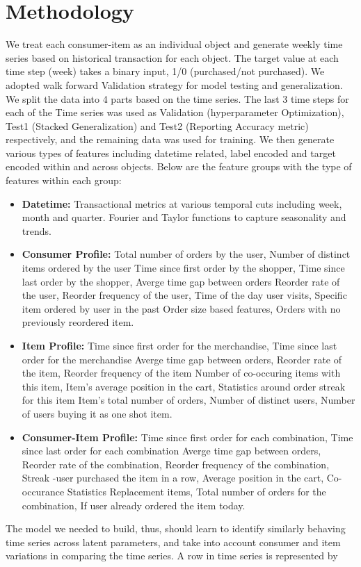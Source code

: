\section{Methodology}
We treat each consumer-item as an individual object and generate weekly time series based on historical transaction for 
each object. The target value at each time step (week) takes a binary input, 1/0 (purchased/not purchased).
We adopted walk forward Validation strategy for model testing and generalization. We split the data into 4 parts
based on the time series. The last 3 time steps for each of the Time series was used as Validation (hyperparameter Optimization),
Test1 (Stacked Generalization) and Test2 (Reporting Accuracy metric) respectively, and the remaining data was used for training.
We then generate various types of features including datetime related, label encoded and target encoded 
within and across objects. Below are the feature groups with the type of features within each group:
\begin{itemize}
\item {\bf Datetime:} Transactional metrics at various temporal cuts including week, month and quarter. 
Fourier and Taylor functions to capture seasonality and trends.
\item {\bf Consumer Profile:} Total number of orders by the user, Number of distinct items ordered by the user
Time since first order by the shopper, Time since last order by the shopper, Averge time gap between orders
Reorder rate of the user, Reorder frequency of the user, Time of the day user visits, Specific item ordered by user in the past
Order size based features, Orders with no previously reordered item.
\item {\bf Item Profile:} Time since first order for the merchandise, Time since last order for the merchandise
Averge time gap between orders, Reorder rate of the item, Reorder frequency of the item
Number of co-occuring items with this item, Item's average position in the cart, Statistics around order streak for this item
Item's total number of orders, Number of distinct users, Number of users buying it as one shot item.
\item {\bf Consumer-Item Profile:} Time since first order for each combination, Time since last order for each combination
Averge time gap between orders, Reorder rate of the combination, Reorder frequency of the combination, 
Streak -user purchased the item in a row, Average position in the cart, Co-occurance Statistics
Replacement items, Total number of orders for the combination, If user already ordered the item today.
\end{itemize}
The model we needed to build, thus, should learn to identify similarly behaving time series across latent
parameters, and take into account consumer and item variations in comparing the time series. A row in time series 
is represented by

